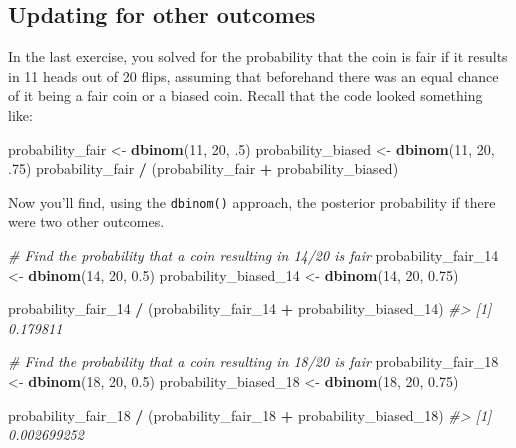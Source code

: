 \documentclass[]{article}
\newenvironment{Shaded}{\begin{snugshade}}{\end{snugshade}}
\newcommand{\CommentTok}[1]{\textcolor[rgb]{0.56,0.35,0.01}{\textit{#1}}}
\newcommand{\DecValTok}[1]{\textcolor[rgb]{0.00,0.00,0.81}{#1}}
\newcommand{\FloatTok}[1]{\textcolor[rgb]{0.00,0.00,0.81}{#1}}
\newcommand{\KeywordTok}[1]{\textcolor[rgb]{0.13,0.29,0.53}{\textbf{#1}}}
\newcommand{\NormalTok}[1]{#1}
\newcommand{\OperatorTok}[1]{\textcolor[rgb]{0.81,0.36,0.00}{\textbf{#1}}}
\newcommand{\StringTok}[1]{\textcolor[rgb]{0.31,0.60,0.02}{#1}}
\begin{document}
\hypertarget{updating-for-other-outcomes}{%
\subsection{Updating for other
outcomes}\label{updating-for-other-outcomes}}

In the last exercise, you solved for the probability that the coin is
fair if it results in 11 heads out of 20 flips, assuming that beforehand
there was an equal chance of it being a fair coin or a biased coin.
Recall that the code looked something like:

\begin{Shaded}
\begin{Highlighting}[]
\NormalTok{probability_fair <-}\StringTok{ }\KeywordTok{dbinom}\NormalTok{(}\DecValTok{11}\NormalTok{, }\DecValTok{20}\NormalTok{, }\FloatTok{.5}\NormalTok{)}
\NormalTok{probability_biased <-}\StringTok{ }\KeywordTok{dbinom}\NormalTok{(}\DecValTok{11}\NormalTok{, }\DecValTok{20}\NormalTok{, }\FloatTok{.75}\NormalTok{)}
\NormalTok{probability_fair }\OperatorTok{/}\StringTok{ }\NormalTok{(probability_fair }\OperatorTok{+}\StringTok{ }\NormalTok{probability_biased)}
\end{Highlighting}
\end{Shaded}

Now you'll find, using the \texttt{dbinom()} approach, the posterior
probability if there were two other outcomes.

\begin{Shaded}
\begin{Highlighting}[]
\CommentTok{# Find the probability that a coin resulting in 14/20 is fair}
\NormalTok{probability_fair_}\DecValTok{14}\NormalTok{ <-}\StringTok{ }\KeywordTok{dbinom}\NormalTok{(}\DecValTok{14}\NormalTok{, }\DecValTok{20}\NormalTok{, }\FloatTok{0.5}\NormalTok{)}
\NormalTok{probability_biased_}\DecValTok{14}\NormalTok{ <-}\StringTok{ }\KeywordTok{dbinom}\NormalTok{(}\DecValTok{14}\NormalTok{, }\DecValTok{20}\NormalTok{, }\FloatTok{0.75}\NormalTok{)}

\NormalTok{probability_fair_}\DecValTok{14} \OperatorTok{/}\StringTok{ }\NormalTok{(probability_fair_}\DecValTok{14} \OperatorTok{+}\StringTok{ }\NormalTok{probability_biased_}\DecValTok{14}\NormalTok{)}
\CommentTok{#> [1] 0.179811}

\CommentTok{# Find the probability that a coin resulting in 18/20 is fair}
\NormalTok{probability_fair_}\DecValTok{18}\NormalTok{ <-}\StringTok{ }\KeywordTok{dbinom}\NormalTok{(}\DecValTok{18}\NormalTok{, }\DecValTok{20}\NormalTok{, }\FloatTok{0.5}\NormalTok{)}
\NormalTok{probability_biased_}\DecValTok{18}\NormalTok{ <-}\StringTok{ }\KeywordTok{dbinom}\NormalTok{(}\DecValTok{18}\NormalTok{, }\DecValTok{20}\NormalTok{, }\FloatTok{0.75}\NormalTok{)}

\NormalTok{probability_fair_}\DecValTok{18} \OperatorTok{/}\StringTok{ }\NormalTok{(probability_fair_}\DecValTok{18} \OperatorTok{+}\StringTok{ }\NormalTok{probability_biased_}\DecValTok{18}\NormalTok{)}
\CommentTok{#> [1] 0.002699252}
\end{Highlighting}
\end{Shaded}
\end{document}
